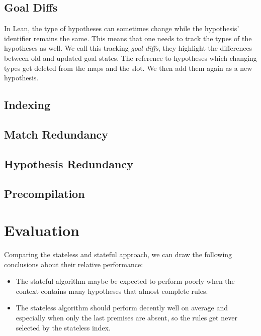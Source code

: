 \documentclass[runningheads]{llncs}
\newcommand{\jcom}[1]{{\color{orange}{Jannis: #1}} }
\begin{document}
\subsection{Goal Diffs}

\jcom{Remove this whole section as too low-level?}
In Lean, the type of hypotheses can sometimes change while the hypothesis' identifier remains the same.
This means that one needs to track the types of the hypotheses as well.
We call this tracking \textit{goal diffs}, they highlight the differences between old and updated goal states.
The reference to hypotheses which changing types get deleted from the maps and the slot.
We then add them again as a new hypothesis.

\subsection{Indexing}

\subsection{Match Redundancy}

\subsection{Hypothesis Redundancy}

\jcom{Mention here that we also use this for the naive algorithm.}

\subsection{Precompilation}

\section{Evaluation}%
\label{sec:evaluation}

Comparing the stateless and stateful approach, we can draw the following conclusions about their relative performance:

\begin{itemize}
    \item The stateful algorithm maybe be expected to perform poorly when the context contains many hypotheses that almost complete rules.
    \item The stateless algorithm should perform decently well on average and especially when only the last premises are absent, so the rules get never selected by the stateless index.
\end{itemize}
\end{document}
